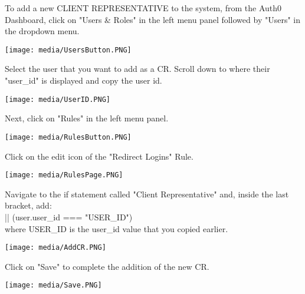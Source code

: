 \documentclass[11pt]{article}
\begin{document}
\begin{flushleft}
    To add a new CLIENT REPRESENTATIVE to the system, from the Auth0 Dashboard, click on "Users \& Roles" in the left menu panel followed by "Users" in the dropdown menu.\\[0.5cm]
\end{flushleft}
\texttt{[image: media/UsersButton.PNG]}
\begin{flushleft}
	Select the user that you want to add as a CR. Scroll down to where their "user\_id" is displayed and copy the user id.\\[0.5cm]
\end{flushleft}
\texttt{[image: media/UserID.PNG]}
\begin{flushleft}
        Next, click on "Rules" in the left menu panel.\\[0.5cm]
\end{flushleft}
\texttt{[image: media/RulesButton.PNG]}
\begin{flushleft}
    Click on the edit icon of the "Redirect Logins" Rule.\\[0.5cm]
\end{flushleft}	
\texttt{[image: media/RulesPage.PNG]}
\begin{flushleft}
    Navigate to the if statement called "Client Representative" and, inside the last bracket, add:\\[0.5cm]
	 || (user.user\_id === "USER\_ID")\\[0.5cm]
	where USER\_ID is the user\_id value that you copied earlier.\\[0.5cm]
\end{flushleft}
\texttt{[image: media/AddCR.PNG]}
\begin{flushleft}
	Click on "Save" to complete the addition of the new CR.\\[0.5cm]
\end{flushleft}
\texttt{[image: media/Save.PNG]}
\end{document}
